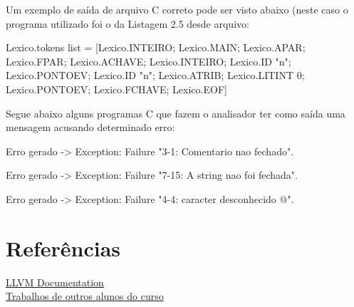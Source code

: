 \documentclass[12pt,a4paper,twoside]{report}
\begin{document}
Um exemplo de saída de arquivo C correto pode ser visto abaixo (neste caso o programa utilizado foi o da Listagem 2.5 desde arquivo:

Lexico.tokens list =
[Lexico.INTEIRO; Lexico.MAIN; Lexico.APAR; Lexico.FPAR; Lexico.ACHAVE;
 Lexico.INTEIRO; Lexico.ID "n"; Lexico.PONTOEV; Lexico.ID "n"; Lexico.ATRIB;
 Lexico.LITINT 0; Lexico.PONTOEV; Lexico.FCHAVE; Lexico.EOF]

Segue abaixo alguns programas C que fazem o analisador ter como saída uma mensagem acusando determinado erro:

Erro gerado -> Exception: Failure "3-1: Comentario nao fechado".


Erro gerado -> Exception: Failure "7-15: A string nao foi fechada".


Erro gerado -> Exception: Failure "4-4: caracter desconhecido @".



\chapter{Referências}
\href{http://llvm.org/releases/3.3/docs/LangRef.html}{LLVM Documentation}\\
\href{https://groups.google.com/forum/#!forum/comp_ufu}{Trabalhos de outros alunos do curso}\\
  
\end{document}
